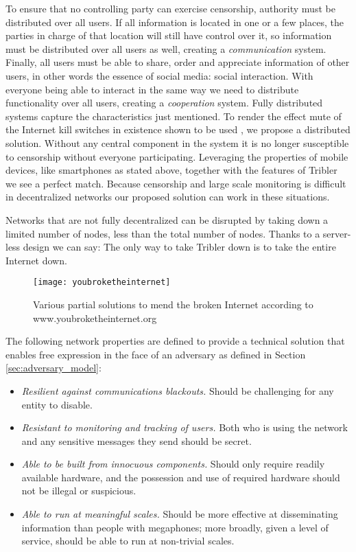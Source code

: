 To ensure that no controlling party can exercise censorship, authority must be distributed over all users. %
If all information is located in one or a few places, the parties in charge of that location will still have control over it, so information must be distributed over all users as well, creating a \emph{communication} system.
Finally, all users must be able to share, order and appreciate information of other users, in other words the essence of social media: social interaction.
With everyone being able to interact in the same way we need to  distribute functionality over all users, creating a \emph{cooperation} system.
Fully distributed systems capture the characteristics just mentioned.
To render the effect mute of the Internet kill switches in existence shown to be used \cite{renesys2011egypt}, we propose a distributed solution.
Without any central component in the system it is no longer susceptible to censorship without everyone participating.
Leveraging the properties of mobile devices, like smartphones as stated above, together with the features of Tribler we see a perfect match.
Because censorship and large scale monitoring is difficult in decentralized networks our proposed solution can work in these situations.

Networks that are not fully decentralized can be disrupted by taking down a limited number of nodes, less than the total number of nodes.
Thanks to a server-less design we can say:
The only way to take Tribler down is to take the entire Internet down.

\begin{figure}[ht]
	\centering
	\texttt{[image: youbroketheinternet]}
	\caption{Various partial solutions to mend the broken Internet according to www.youbroketheinternet.org}
	\label{fig:youbroketheinternet}
\end{figure}

The following network properties are defined \cite{hasan2013dissent} to provide a technical solution that enables free expression in the face of an adversary as defined in Section \ref{sec:adversary_model}:
\begin{itemize}
	\item \emph{Resilient against communications blackouts.}
	Should be challenging for any entity to disable.
	\item \emph{Resistant to monitoring and tracking of users.}
	Both who is using the network and any sensitive messages they send should be secret.
	\item \emph{Able to be built from innocuous components.}
	Should only require readily available hardware, and the possession and use of required hardware should not be illegal or suspicious.
	\item \emph{Able to run at meaningful scales.}
	Should be more effective at disseminating information than people with megaphones; more broadly, given a level of service, should be able to run at non-trivial scales.
\end{itemize}

